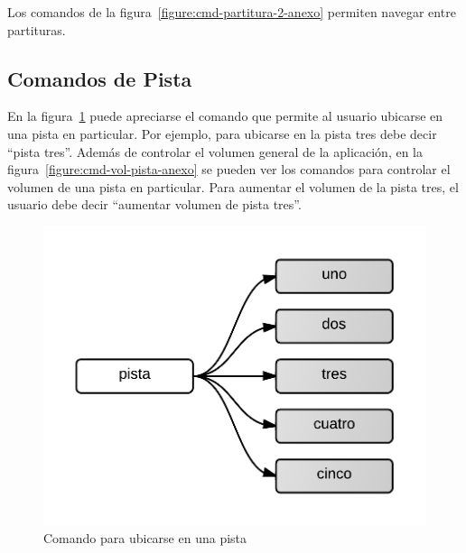 Los comandos de la figura~\ref{figure:cmd-partitura-2-anexo} permiten navegar entre partituras.
 
\subsection{Comandos de Pista} 
En la figura~\ref{figure:cmd-pista-1-anexo} puede apreciarse el comando que permite al usuario ubicarse en una pista en particular. Por  
ejemplo, para ubicarse en la pista tres debe decir “pista tres”. Adem\'as de controlar el volumen general de la aplicaci\'on, en 
la figura~\ref{figure:cmd-vol-pista-anexo} se pueden ver los comandos para controlar el volumen de una pista en particular. Para aumentar
el volumen de la pista tres, el usuario debe decir ``aumentar volumen de pista tres''.

\begin{figure}[H]  
\centering
\includegraphics[width=0.6\linewidth]{./graphics/cmd-pista-1.png}
\caption{Comando para ubicarse en una pista}
\label{figure:cmd-pista-1-anexo}
\end{figure}

